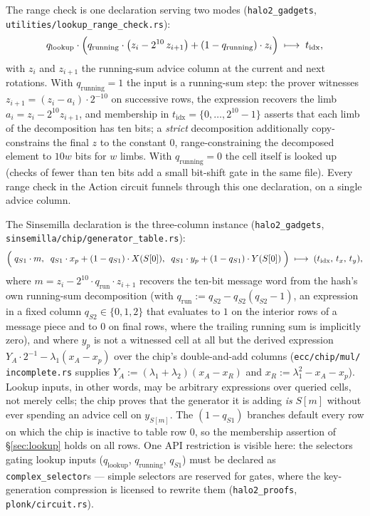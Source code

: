 \documentclass[11pt,a4paper]{article}
\theoremstyle{definition}
\begin{document}
The range check is one declaration serving two modes
(\texttt{halo2\_gadgets},
\texttt{utilities/\allowbreak lookup\_range\_check.rs}):
\begin{equation}
\label{eq:lookup-range}
q_{\mathrm{lookup}} \cdot \Bigl(
  q_{\mathrm{running}} \cdot \bigl( z_i - 2^{10}\, z_{i+1} \bigr)
  + (1 - q_{\mathrm{running}}) \cdot z_i
\Bigr)
\;\longmapsto\; t_{\mathrm{idx}},
\end{equation}
with $z_i$ and $z_{i+1}$ the running-sum advice column at the current and
next rotations. With $q_{\mathrm{running}} = 1$ the input is a running-sum
step: the prover witnesses $z_{i+1} = (z_i - a_i) \cdot 2^{-10}$ on
successive rows, the expression recovers the limb
$a_i = z_i - 2^{10} z_{i+1}$, and membership in $t_{\mathrm{idx}} =
\{0, \dots, 2^{10}-1\}$ asserts that each limb of the decomposition has ten
bits; a \emph{strict} decomposition additionally copy-constrains the final
$z$ to the constant $0$, range-constraining the decomposed element to
$10w$ bits for $w$ limbs. With $q_{\mathrm{running}} = 0$ the cell itself
is looked up (checks of fewer than ten bits add a small bit-shift gate in
the same file). Every range check in the Action circuit funnels through
this one declaration, on a single advice column.

The Sinsemilla declaration is the three-column instance
(\texttt{halo2\_gadgets},
\texttt{sinsemilla/\allowbreak chip/\allowbreak generator\_table.rs}):
\begin{equation}
\label{eq:lookup-sinsemilla}
\Bigl(\;
q_{S1} \cdot m,\;\;
q_{S1} \cdot x_p + (1 - q_{S1}) \cdot X(S[0]),\;\;
q_{S1} \cdot y_p + (1 - q_{S1}) \cdot Y(S[0])
\;\Bigr)
\;\longmapsto\;
(t_{\mathrm{idx}},\, t_x,\, t_y),
\end{equation}
where $m = z_i - 2^{10} \cdot q_{\mathrm{run}} \cdot z_{i+1}$ recovers the
ten-bit message word from the hash's own running-sum decomposition (with
$q_{\mathrm{run}} := q_{S2} - q_{S2}(q_{S2} - 1)$, an expression in a fixed
column $q_{S2} \in \{0, 1, 2\}$ that evaluates to $1$ on the interior rows
of a message piece and to $0$ on final rows, where the trailing running sum
is implicitly zero), and where $y_p$ is not a witnessed cell at all but the
derived expression $Y_A \cdot 2^{-1} - \lambda_1 (x_A - x_p)$ over the
chip's double-and-add columns (\texttt{ecc/chip/mul/\allowbreak
incomplete.rs} supplies
$Y_A := (\lambda_1 + \lambda_2)(x_A - x_R)$ and
$x_R := \lambda_1^2 - x_A - x_p$). Lookup inputs, in other words, may be
arbitrary expressions over queried cells, not merely cells; the chip
proves that the generator it is adding \emph{is} $S[m]$ without ever
spending an advice cell on $y_{S[m]}$. The $(1 - q_{S1})$ branches default
every row on which the chip is inactive to table row $0$, so the membership
assertion of \S\ref{sec:lookup} holds on all rows. One API restriction is
visible here: the selectors gating lookup inputs
($q_{\mathrm{lookup}}$, $q_{\mathrm{running}}$, $q_{S1}$) must be declared
as \texttt{complex\_selector}s --- simple selectors are reserved for gates,
where the key-generation compression is licensed to rewrite them
(\texttt{halo2\_proofs}, \texttt{plonk/circuit.rs}).
\end{document}
